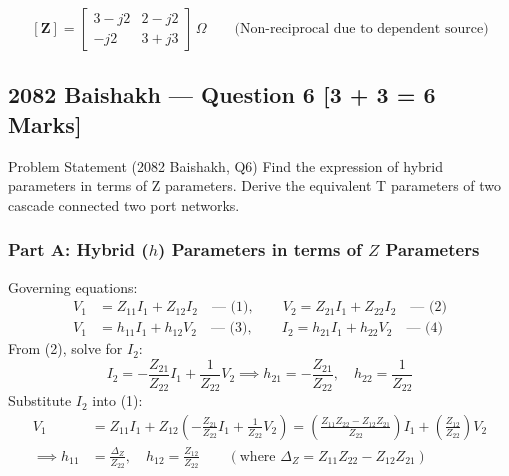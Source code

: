 \documentclass[11pt,a4paper,oneside]{article}
\begin{document}
\begin{answerbox}
\[
\mathbf{[Z]} = \begin{bmatrix} 3 - j2 & 2 - j2 \\ -j2 & 3 + j3 \end{bmatrix}\,\Omega \qquad \text{(Non-reciprocal due to dependent source)}
\]
\end{answerbox}

\newpage

\subsection{2082 Baishakh --- Question 6 [3 + 3 = 6 Marks]}

\begin{questionbox}{Problem Statement (2082 Baishakh, Q6)}
Find the expression of hybrid parameters in terms of Z parameters. Derive the equivalent T parameters of two cascade connected two port networks.
\end{questionbox}

\subsubsection*{Part A: Hybrid ($h$) Parameters in terms of $Z$ Parameters}
Governing equations:
\begin{align}
  V_1 &= Z_{11} I_1 + Z_{12} I_2 \quad \text{--- (1)}, \qquad V_2 = Z_{21} I_1 + Z_{22} I_2 \quad \text{--- (2)} \\
  V_1 &= h_{11} I_1 + h_{12} V_2 \quad \text{--- (3)}, \qquad I_2 = h_{21} I_1 + h_{22} V_2 \quad \text{--- (4)}
\end{align}
From (2), solve for $I_2$:
\begin{equation}
  I_2 = -\frac{Z_{21}}{Z_{22}} I_1 + \frac{1}{Z_{22}} V_2 \implies h_{21} = -\frac{Z_{21}}{Z_{22}}, \quad h_{22} = \frac{1}{Z_{22}}
\end{equation}
Substitute $I_2$ into (1):
\begin{align}
  V_1 &= Z_{11} I_1 + Z_{12}\left(-\frac{Z_{21}}{Z_{22}} I_1 + \frac{1}{Z_{22}} V_2\right) = \left(\frac{Z_{11}Z_{22} - Z_{12}Z_{21}}{Z_{22}}\right) I_1 + \left(\frac{Z_{12}}{Z_{22}}\right) V_2 \nonumber \\
  \implies h_{11} &= \frac{\Delta_Z}{Z_{22}}, \quad h_{12} = \frac{Z_{12}}{Z_{22}} \qquad (\text{where } \Delta_Z = Z_{11}Z_{22} - Z_{12}Z_{21})
\end{align}
\end{document}
